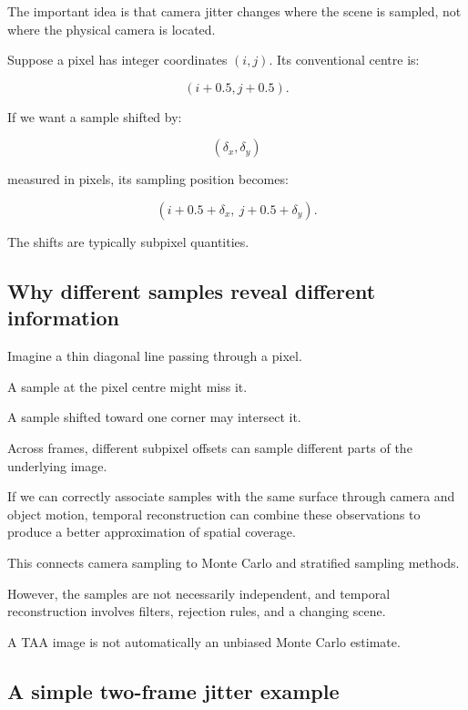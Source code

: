 The important idea is that camera jitter changes where the scene is sampled, not where the physical camera is located.

Suppose a pixel has integer coordinates \((i,j)\). Its conventional centre is:

\[
 (i+0.5,j+0.5).
\]

If we want a sample shifted by:

\[
 (\delta_x,\delta_y)
\]

measured in pixels, its sampling position becomes:

\[
 \boxed{ (i+0.5+\delta_x,\ j+0.5+\delta_y) }.
\]

The shifts are typically subpixel quantities.

\subsection{Why different samples reveal different information}\label{02-foundations-ii-ch036-why-different-samples-reveal-different-information}

\hypertarget{02-foundations-ii-ch036-why-different-samples-reveal-different-information}{}

Imagine a thin diagonal line passing through a pixel.

A sample at the pixel centre might miss it.

A sample shifted toward one corner may intersect it.

Across frames, different subpixel offsets can sample different parts of the underlying image.

If we can correctly associate samples with the same surface through camera and object motion, temporal reconstruction can combine these observations to produce a better approximation of spatial coverage.

This connects camera sampling to Monte Carlo and stratified sampling methods.

However, the samples are not necessarily independent, and temporal reconstruction involves filters, rejection rules, and a changing scene.

A TAA image is not automatically an unbiased Monte Carlo estimate.

\subsection{A simple two-frame jitter example}\label{02-foundations-ii-ch036-a-simple-two-frame-jitter-example}

